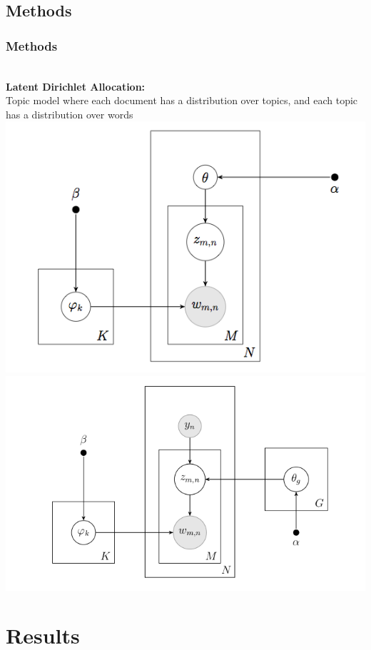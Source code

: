 \documentclass[t,ignorenonframetext]{beamer}
\begin{document}
\subsection{Methods}
\frametitle{Methods}
\begin{frame}
~\\\textbf{Latent Dirichlet Allocation:} \\Topic model where each document has a distribution over topics, and each topic has a distribution over words\\
\includegraphics[scale=0.25]{original_lda}
\includegraphics[scale=0.25]{plate2}
\end{frame}





\section[Results]{Results}
\end{document}
